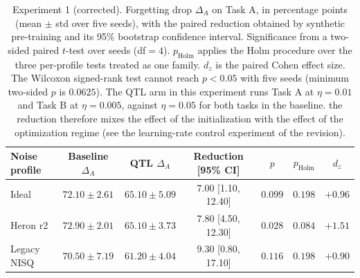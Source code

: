 \begin{table}[ht]
\centering
\small
\setlength{\tabcolsep}{4pt}
\caption{Experiment 1 (corrected). Forgetting drop $\Delta_A$ on Task A, in percentage points (mean $\pm$ std over five seeds), with the paired reduction obtained by synthetic pre-training and its 95\% bootstrap confidence interval. Significance from a two-sided paired $t$-test over seeds (df$=4$). $p_{\text{Holm}}$ applies the Holm procedure over the three per-profile tests treated as one family. $d_z$ is the paired Cohen effect size. The Wilcoxon signed-rank test cannot reach $p<0.05$ with five seeds (minimum two-sided $p$ is $0.0625$). The QTL arm in this experiment runs Task A at $\eta=0.01$ and Task B at $\eta=0.005$, against $\eta=0.05$ for both tasks in the baseline. the reduction therefore mixes the effect of the initialization with the effect of the optimization regime (see the learning-rate control experiment of the revision).}
\label{tab:exp1}
\begin{tabular}{lcccccc}
\toprule
Noise profile & Baseline $\Delta_A$ & QTL $\Delta_A$ & Reduction [95\% CI] & $p$ & $p_{\text{Holm}}$ & $d_z$ \\
\midrule
Ideal       & $72.10 \pm 2.61$ & $65.10 \pm 5.09$ & $7.00$ [1.10, 12.40] & $0.099$ & $0.198$ & $+0.96$ \\
Heron r2    & $72.90 \pm 2.01$ & $65.10 \pm 3.73$ & $7.80$ [4.50, 12.30] & $0.028$ & $0.084$ & $+1.51$ \\
Legacy NISQ & $70.50 \pm 7.19$ & $61.20 \pm 4.04$ & $9.30$ [0.80, 17.10] & $0.116$ & $0.198$ & $+0.90$ \\
\bottomrule
\end{tabular}
\end{table}
